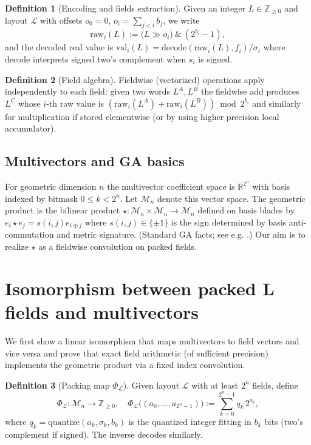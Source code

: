\documentclass[11pt]{article}
\theoremstyle{definition}
\newtheorem{definition}{Definition}[section]
\theoremstyle{plain}
\begin{document}
\begin{definition}[Encoding and fields extraction]
Given an integer \(L\in\mathbb{Z}_{\ge 0}\) and layout \(\mathcal{L}\) with offsets \(o_0=0\), \(o_i=\sum_{j<i} b_j\), we write
\[
\mathrm{raw}_i(L) := \big( L \gg o_i \big) \ \&\ (2^{b_i}-1),
\]
and the decoded real value is \(\mathrm{val}_i(L) = \mathrm{decode}(\mathrm{raw}_i(L),f_i)/\sigma_i\) where \(\mathrm{decode}\) interprets signed two's complement when \(s_i\) is signed.
\end{definition}

\begin{definition}[Field algebra]
Fieldwise (vectorized) operations apply independently to each field: given two words \(L^A,L^B\) the fieldwise add produces \(L^C\) whose \(i\)-th raw value is \((\mathrm{raw}_i(L^A) + \mathrm{raw}_i(L^B)) \bmod 2^{b_i}\) and similarly for multiplication if stored elementwise (or by using higher precision local accumulator).
\end{definition}

\subsection{Multivectors and GA basics}
For geometric dimension \(n\) the multivector coefficient space is \(\mathbb{R}^{2^n}\) with basis indexed by bitmask \(0\le k<2^n\). Let \(\mathcal{M}_n\) denote this vector space. The geometric product is the bilinear product \(\star: \mathcal{M}_n\times\mathcal{M}_n\to\mathcal{M}_n\) defined on basis blades by \(e_i\star e_j = s(i,j) e_{i\oplus j}\) where \(s(i,j)\in\{\pm 1\}\) is the sign determined by basis anti-commutation and metric signature. (Standard GA facts; see e.g. \cite{ga-basics}.) Our aim is to realize \(\star\) as a fieldwise convolution on packed fields.

\section{Isomorphism between packed L fields and multivectors}
We first show a linear isomorphism that maps multivectors to field vectors and vice versa and prove that exact field arithmetic (of sufficient precision) implements the geometric product via a fixed index convolution.

\begin{definition}[Packing map \(\Phi_{\mathcal{L}}\)]
Given layout \(\mathcal{L}\) with at least \(2^n\) fields, define
\[
\Phi_{\mathcal{L}}: \mathcal{M}_n \to \mathbb{Z}_{\ge 0},\quad
\Phi_{\mathcal{L}}\big( (a_0,\dots,a_{2^n-1}) \big) := \sum_{k=0}^{2^n-1} q_k \, 2^{o_k},
\]
where \(q_k=\mathrm{quantize}(a_k,\sigma_k,b_k)\) is the quantized integer fitting in \(b_k\) bits (two's complement if signed). The inverse decodes similarly.
\end{definition}
\end{document}

